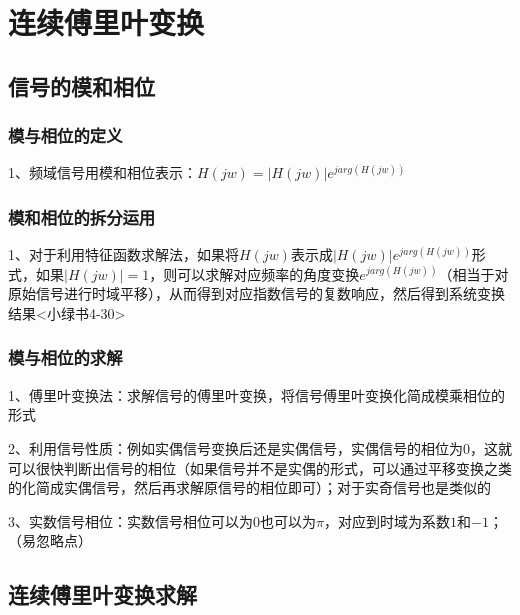 \chapter{连续傅里叶变换}

\section{信号的模和相位}



\subsection{模与相位的定义}

1、频域信号用模和相位表示：$H(jw) = |H(jw)|e^{jarg(H(jw))}$



\subsection{模和相位的拆分运用}

1、对于利用特征函数求解法，如果将$H(jw)$表示成$ |H(jw)|e^{jarg(H(jw))}$形式，如果$ |H(jw)|=1$，则可以求解对应频率的角度变换$e^{jarg(H(jw))}$（相当于对原始信号进行时域平移），从而得到对应指数信号的复数响应，然后得到系统变换结果<小绿书4-30>



\subsection{模与相位的求解}

1、傅里叶变换法：求解信号的傅里叶变换，将信号傅里叶变换化简成模乘相位的形式

2、利用信号性质：例如实偶信号变换后还是实偶信号，实偶信号的相位为0，这就可以很快判断出信号的相位（如果信号并不是实偶的形式，可以通过平移变换之类的化简成实偶信号，然后再求解原信号的相位即可）；对于实奇信号也是类似的

3、实数信号相位：实数信号相位可以为$0$也可以为$\pi$，对应到时域为系数$1$和$-1$；（易忽略点）

\section{连续傅里叶变换求解}



